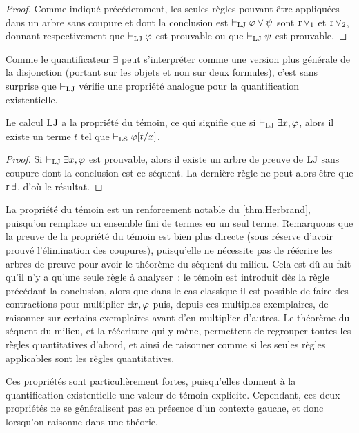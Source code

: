 \begin{proof}
  Comme indiqué précédemment, les seules règles pouvant être appliquées dans un
  arbre sans coupure et dont la conclusion est $\vdash_{\operatorname{LJ}}\varphi\lor\psi$ sont
  $\operatorname{r}\mathord{\lor}_{1}$ et $\operatorname{r}\mathord{\lor}_{2}$, donnant respectivement que $\vdash_{\operatorname{LJ}}\varphi$ est prouvable
  ou que $\vdash_{\operatorname{LJ}}\psi$ est prouvable.
\end{proof}

Comme le quantificateur $\exists$ peut s'interpréter comme une version plus
générale de la disjonction (portant sur les objets et non sur deux formules),
c'est sans surprise que $\vdash_{\operatorname{LJ}}$ vérifie une propriété analogue pour la
quantification existentielle.

\begin{property}[Témoin]
  Le calcul $\operatorname{LJ}$ a la propriété du témoin, ce qui signifie que si
  $\vdash_{\operatorname{LJ}}\exists x,\varphi$, alors il existe un terme $t$ tel que
  $\vdash_{\operatorname{LS}}\varphi[t/x]$.
\end{property}

\begin{proof}
  Si $\vdash_{\operatorname{LJ}}\exists x, \varphi$ est prouvable, alors il existe un arbre de
  preuve de $\operatorname{LJ}$ sans coupure dont la conclusion est ce séquent. La dernière
  règle ne peut alors être que $\operatorname{r}\mathord{\exists}$, d'où le résultat.
\end{proof}

La propriété du témoin est un renforcement notable du \cref{thm.Herbrand},
puisqu'on remplace un ensemble fini de termes en un seul terme. Remarquons que
la preuve de la propriété du témoin est bien plus directe (sous réserve d'avoir
prouvé l'élimination des coupures), puisqu'elle ne nécessite pas de réécrire les
arbres de preuve pour avoir le théorème du séquent du milieu. Cela est dû au
fait qu'il n'y a qu'une seule règle à analyser~: le témoin est introduit dès
la règle précédant la conclusion, alors que dans le cas classique il est
possible de faire des contractions pour multiplier $\exists x,\varphi$ puis,
depuis ces multiples exemplaires, de raisonner sur certains exemplaires avant
d'en multiplier d'autres. Le théorème du séquent du milieu, et la réécriture qui
y mène, permettent de regrouper toutes les règles quantitatives d'abord,
et ainsi de raisonner comme si les seules règles applicables sont les
règles quantitatives.

Ces propriétés sont particulièrement fortes, puisqu'elles donnent à la
quantification existentielle une valeur de témoin explicite. Cependant, ces
deux propriétés ne se généralisent pas en présence d'un contexte gauche, et
donc lorsqu'on raisonne dans une théorie.

